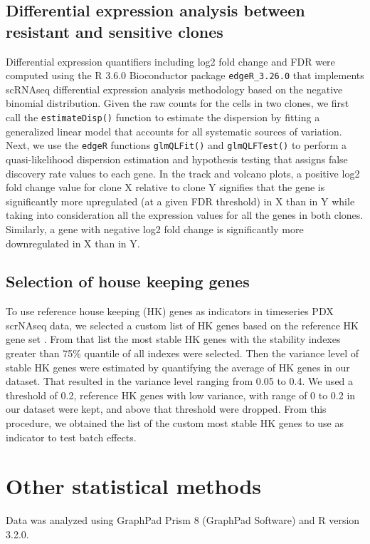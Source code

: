 \subsection{Differential expression analysis between resistant and sensitive clones}
Differential expression quantifiers including log2 fold change and FDR  were computed using the R 3.6.0 Bioconductor package \texttt{edgeR\_3.26.0} that implements scRNAseq differential expression analysis methodology based on the negative binomial distribution. Given the raw counts for the cells in two clones, we first call the \texttt{estimateDisp()} function to estimate the dispersion by fitting a generalized linear model that accounts for all systematic sources of variation. Next, we use the \texttt{edgeR} functions \texttt{glmQLFit()} and \texttt{glmQLFTest()} to perform a quasi-likelihood dispersion estimation and hypothesis testing that assigns false discovery rate values to each gene. In the track and volcano plots, a positive log2 fold change value for clone X relative to clone Y signifies that the gene is significantly more upregulated (at a given FDR threshold) in X than in Y while taking into consideration all the expression values for all the genes in both clones. Similarly, a gene with negative log2 fold change is significantly more downregulated in X than in Y. 

\subsection{Selection of house keeping genes}
To use reference house keeping (HK) genes as indicators in timeseries PDX scrNAseq data, we selected a custom list of HK genes based on the reference HK gene set \cite{lin2019evaluating}. From that list the most stable HK genes with the stability indexes  greater than 75\% quantile of all indexes were selected. Then the variance level of stable HK genes were estimated by quantifying the average of HK genes in our dataset. That resulted in the variance level ranging from 0.05 to 0.4. We used a threshold of 0.2, reference HK genes with low variance, with range of 0 to 0.2 in our dataset were kept, and above that threshold were dropped. From this procedure, we obtained the list of the custom most stable HK genes to use as indicator to test batch effects. 

\section{Other statistical methods}
Data was analyzed using GraphPad Prism 8 (GraphPad Software) and R version 3.2.0.